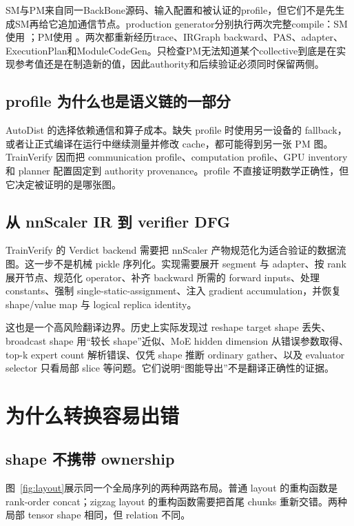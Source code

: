 \documentclass[10.5pt,a4paper]{ctexart}
\begin{document}
SM与PM来自同一BackBone源码、输入配置和被认证的profile，但它们不是先生成SM再给它追加通信节点。production generator分别执行两次完整compile：SM使用 ；PM使用 。两次都重新经历trace、IRGraph backward、PAS、adapter、ExecutionPlan和ModuleCodeGen。只检查PM无法知道某个collective到底是在实现参考值还是在制造新的值，因此authority和后续验证必须同时保留两侧。

\subsection{profile 为什么也是语义链的一部分}

AutoDist 的选择依赖通信和算子成本。缺失 profile 时使用另一设备的 fallback，或者让正式编译在运行中继续测量并修改 cache，都可能得到另一张 PM 图。TrainVerify 因而把 communication profile、computation profile、GPU inventory 和 planner 配置固定到 authority provenance。profile 不直接证明数学正确性，但它决定被证明的是哪张图。

\subsection{从 nnScaler IR 到 verifier DFG}

TrainVerify 的 Verdict backend 需要把 nnScaler 产物规范化为适合验证的数据流图。这一步不是机械 pickle 序列化。实现需要展开 segment 与 adapter、按 rank 展开节点、规范化 operator、补齐 backward 所需的 forward inputs、处理 constants、强制 single-static-assignment、注入 gradient accumulation，并恢复 shape/value map 与 logical replica identity。

这也是一个高风险翻译边界。历史上实际发现过 reshape target shape 丢失、broadcast shape 用“较长 shape”近似、MoE hidden dimension 从错误参数取得、top-k expert count 解析错误、仅凭 shape 推断 ordinary gather、以及 evaluator selector 只看局部 slice 等问题。它们说明“图能导出”不是翻译正确性的证据。

\section{为什么转换容易出错}

\subsection{shape 不携带 ownership}

图~\ref{fig:layout}展示同一个全局序列的两种两路布局。普通 layout 的重构函数是 rank-order concat；zigzag layout 的重构函数需要把首尾 chunks 重新交错。两种局部 tensor shape 相同，但 relation 不同。
\end{document}
